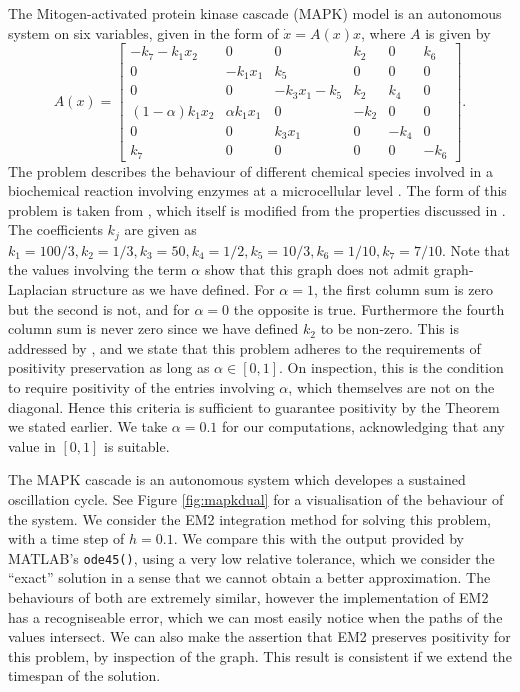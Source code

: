 The Mitogen-activated protein kinase cascade (MAPK) model is an autonomous system on six variables,
given in the form of $\dot{x} = A(x)x$, where $A$ is given by
\begin{equation*}
    A(x) = \begin{bmatrix}
        -k_7 - k_1 x_2      & 0              & 0            & k_2  & 0    & k_6 \\
        0                   & -k_1 x_1       & k_5          & 0    & 0    & 0 \\
        0                   & 0              & -k_3 x_1-k_5 & k_2  & k_4  & 0 \\
        (1 - \alpha)k_1 x_2 & \alpha k_1 x_1 & 0            & -k_2 & 0    & 0 \\
        0                   & 0              & k_3 x_1      & 0    & -k_4 & 0 \\
        k_7                 & 0              & 0            & 0    & 0    & -k_6
    \end{bmatrix}.
\end{equation*}
The problem describes the behaviour of different chemical species involved in a biochemical reaction involving enzymes at a microcellular level \cite{hadavc2017mapk}. 
The form of this problem is taken from \cite{blanes_pos_2022}, which itself is modified from the properties discussed in \cite{hadavc2017mapk}.
The coefficients $k_j$ are given as $k_1 = 100/3, k_2 = 1/3, k_3 = 50, k_4 = 1/2, k_5 = 10/3, k_6 = 1/10, k_7 = 7/10$.
Note that the values involving the term $\alpha$ show that this graph does not admit graph-Laplacian structure as we have defined.
For $\alpha = 1$, the first column sum is zero but the second is not,
and for $\alpha = 0$ the opposite is true.
Furthermore the fourth column sum is never zero since we have defined $k_2$ to be non-zero.
This is addressed by \cite{blanes_pos_2022}, and we state that this problem adheres to the requirements of positivity preservation as long as $\alpha \in [0,1]$.
On inspection, this is the condition to require positivity of the entries involving $\alpha$, which themselves are not on the diagonal.
Hence this criteria is sufficient to guarantee positivity by the Theorem we stated earlier.
We take $\alpha = 0.1$ for our computations, acknowledging that any value in $[0,1]$ is suitable.

The MAPK cascade is an autonomous system which developes a sustained oscillation cycle.
See Figure \ref{fig:mapkdual} for a visualisation of the behaviour of the system.
We consider the EM2 integration method for solving this problem, with a time step of $h=0.1$.
We compare this with the output provided by MATLAB's \texttt{ode45()}, using a very low relative tolerance, which we consider the ``exact'' solution in a sense that we cannot obtain a better approximation.
The behaviours of both are extremely similar, however the implementation of EM2 has a recogniseable error, which we can most easily notice when the paths of the values intersect.
We can also make the assertion that EM2 preserves positivity for this problem, by inspection of the graph.
This result is consistent if we extend the timespan of the solution. 


